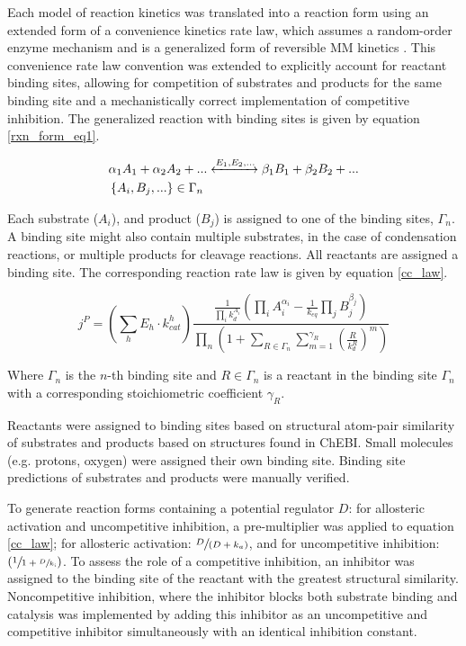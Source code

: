 \documentclass[12pt]{nature}\usepackage{graphicx, color}
\begin{document}
Each model of reaction kinetics was translated into a reaction form using an extended form of a convenience kinetics rate law, which assumes a random-order enzyme mechanism and is a generalized form of reversible MM kinetics \cite{main-Liebermeister:2006fm}. This convenience rate law convention was extended to explicitly account for reactant binding sites, allowing for competition of substrates and products for the same binding site and a mechanistically correct implementation of competitive inhibition. The generalized reaction with binding sites is given by equation \ref{rxn_form_eq1}.

\begin{align}
&\alpha_{1}A_{1} + \alpha_{2}A_{2} + ... \xleftrightarrow{E_{1}, E_{2}, ...} \beta_{1}B_{1} + \beta_{2}B_{2} + ...\notag\\
&\left\{A_{i}, B_{j}, ...\right\} \in \Gamma_{n}\label{rxn_form_eq1}
\end{align}

Each substrate ($A_{i}$), and product ($B_{j}$) is assigned to one of the binding sites, $\Gamma_{n}$. A binding site might also contain multiple substrates, in the case of condensation reactions, or multiple products for cleavage reactions. All reactants are assigned a binding site. The corresponding reaction rate law is given by equation \ref{cc_law}.

\begin{equation}
j^{P} = \left(\sum_{h}E_{h} \cdot k^{h}_{cat}\right)\frac{\frac{1}{\prod_{i}k_{d}^{A_{i}}}\left(\prod_{i}A_{i}^{\alpha_{i}} - \frac{1}{k_{eq}} \prod_{j}B_{j}^{\beta_{j}}\right)}{\prod_{n}\left(1 + \sum_{R \in \Gamma_{n}} \sum_{m = 1}^{\gamma_{R}}\left(\frac{R}{k_{d}^{R}}\right)^{m} \right)}\label{cc_law}
\end{equation}

Where $\Gamma_{n}$ is the $n$-th binding site and $R \in \Gamma_{n}$ is a reactant in the binding site $\Gamma_{n}$ with a corresponding stoichiometric coefficient $\gamma_{R}$.

Reactants were assigned to binding sites based on structural atom-pair similarity of substrates and products \cite{Cao:2008fa} based on structures found in ChEBI.  Small molecules (e.g. protons, oxygen) were assigned their own binding site.  Binding site predictions of substrates and products were manually verified.

To generate reaction forms containing a potential regulator $D$: for allosteric activation and uncompetitive inhibition, a pre-multiplier was applied to equation \ref{cc_law}; for allosteric activation: $\sfrac{D}{(D + k_{a})}$, and for uncompetitive inhibition: $(\sfrac{1}{1 + \sfrac{D}{k_{i}}})$.  To assess the role of a competitive inhibition, an inhibitor was assigned to the binding site of the reactant with the greatest structural similarity.  Noncompetitive inhibition, where the inhibitor blocks both substrate binding and catalysis was implemented by adding this inhibitor as an uncompetitive and competitive inhibitor simultaneously with an identical inhibition constant.  
\end{document}
